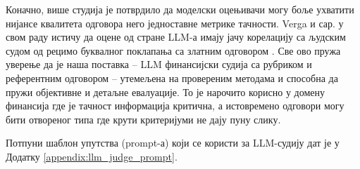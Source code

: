Коначно, више студија је потврдило да моделски оцењивачи могу боље ухватити нијансе квалитета одговора него једноставне метрике тачности. Verga и сар. у свом раду истичу да оцене од стране LLM-а имају јачу корелацију са људским судом од рецимо буквалног поклапања са златним одговором \cite{verga_replacing_judges_2024}. Све ово пружа уверење да је наша поставка -- LLM финансијски судија са рубриком и референтним одговором -- утемељена на провереним методама и способна да пружи објективне и детаљне евалуације. То је нарочито корисно у домену финансија где је тачност информација критична, а истовремено одговори могу бити отвореног типа где крути критеријуми не дају пуну слику.

Потпуни шаблон упутства (prompt-а) који се користи за LLM-судију дат је у Додатку \ref{appendix:llm_judge_prompt}.

